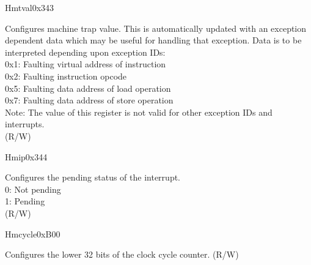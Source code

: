 \begin{register}{H}{mtval}{0x343}\label{regdesc:LPMTVAL}
%
\regnewline%
\begin{regdesc}\begin{reglist}
\label{fielddesc:LPMTVAL}\item [MTVAL] Configures machine trap value. This is automatically updated with an exception dependent data which may be useful for handling that exception. Data is to be interpreted depending upon exception IDs:\\
0x1: Faulting virtual address of instruction\\
0x2: Faulting instruction opcode\\
0x5: Faulting data address of load operation\\
0x7: Faulting data address of store operation\\
Note: The value of this register is not valid for other exception IDs and interrupts.\\
(R/W)
\end{reglist}\end{regdesc}
\end{register}

\begin{register}{H}{mip}{0x344}\label{regdesc:LPMIP}
%
%
%
\regnewline%
\begin{regdesc}\begin{reglist}
\label{fielddesc:LPMIPSIP}\item [IP] Configures the pending status of the interrupt. \\
0: Not pending\\
1: Pending\\
(R/W)
\end{reglist}\end{regdesc}
\end{register}

\begin{register}{H}{mcycle}{0xB00}\label{regdesc:LPMCYCLE}
%
\regnewline%
\begin{regdesc}\begin{reglist}
\label{fielddesc:LPMCYCLE}\item [MCYCLE] Configures the lower 32 bits of the clock cycle counter. (R/W)
\end{reglist}\end{regdesc}
\end{register}

